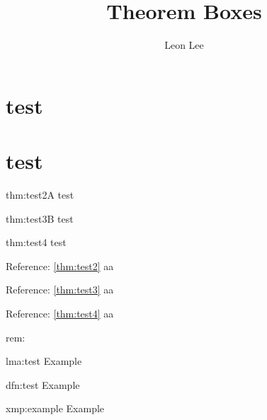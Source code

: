 \documentclass[]{article}
\title{Theorem Boxes}
\author{Leon Lee}
\begin{document}
\maketitle

\useseparatenumbers

\section{test}
\section{test}

\begin{thm}[Example]{thm:test2}{A}
    test
\end{thm}

\begin{thm}[Example]{thm:test3}{B}
    test
\end{thm}

\begin{thm}[Example]{thm:test4}{}
    test
\end{thm}

%
%
%
%
%

Reference: \ref{thm:test2} aa

Reference: \ref{thm:test3} aa

Reference: \ref{thm:test4} aa



\begin{rem}[jkkj]{rem:}{}
    
\end{rem}
\begin{lma}[Example]{lma:test}{}
    Example
\end{lma}

\begin{dfn}[Example]{dfn:test}{}
    Example
\end{dfn}

\begin{xmp}[Example]{xmp:example}{}
    Example
\end{xmp}
\end{document}
